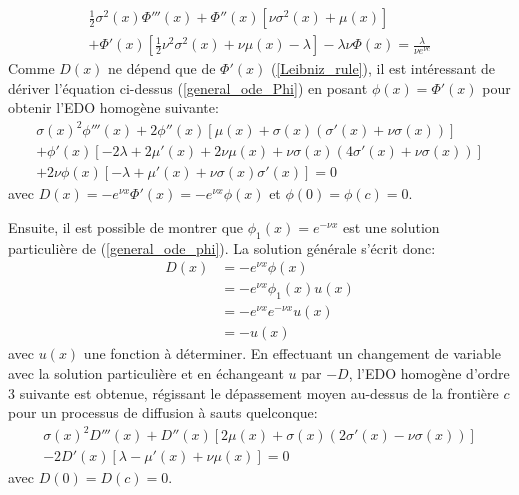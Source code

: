 \begin{equation}\label{general_ode_Phi}
    \begin{aligned}
        \frac{1}{2}\sigma^2(x)\Phi'''(x)+\Phi''(x)\left[\nu\sigma^2(x)+\mu(x)\right]\\+\Phi'(x)\left[\frac{1}{2}\nu^2\sigma^2(x)+\nu\mu(x)-\lambda\right]-\lambda\nu\Phi(x)=\frac{\lambda}{\nu e^{\nu c}}
    \end{aligned}
\end{equation}
Comme $D(x)$ ne dépend que de $\Phi'(x)$ (\ref{Leibniz_rule}), il est intéressant de dériver l'équation ci-dessus (\ref{general_ode_Phi}) en posant $\phi(x)=\Phi'(x)$ pour obtenir l'\acs{EDO} homogène suivante:
\begin{equation}\label{general_ode_phi}
    \begin{aligned}
        \sigma(x)^2 \phi'''(x)+2 \phi''(x) \left[\mu(x)+\sigma(x) \left(\sigma'(x)+\nu  \sigma(x)\right)\right]\\+\phi'(x) \left[-2 \lambda +2 \mu'(x)+2 \nu\mu(x)+\nu  \sigma(x) \left(4 \sigma'(x)+\nu  \sigma(x)\right)\right]\\+2 \nu  \phi(x) \left[-\lambda +\mu'(x)+\nu  \sigma(x) \sigma'(x)\right]=0
    \end{aligned}
\end{equation}
avec $D(x)=-e^{\nu x}\Phi'(x)=-e^{\nu x}\phi(x)$ et $\phi(0)=\phi(c)=0$.

Ensuite, il est possible de montrer que $\phi_1(x)=e^{-\nu x}$ est une solution particulière de (\ref{general_ode_phi}). La solution générale s'écrit donc: 
\[
\begin{aligned}
    D(x)&=-e^{\nu x}\phi(x)\\
    &=-e^{\nu x}\phi_1(x)u(x)\\
    &=-e^{\nu x}e^{-\nu x}u(x)\\
    &=-u(x)
\end{aligned}
\]
avec $u(x)$ une fonction à déterminer. En effectuant un changement de variable avec la solution particulière et en échangeant $u$ par $-D$, l'\acs{EDO} homogène d'ordre 3 suivante est obtenue, régissant le dépassement moyen au-dessus de la frontière $c$ pour un processus de diffusion à sauts quelconque: 
\begin{equation}\label{eq:general_ode_D}
    \begin{aligned}
        \sigma(x)^2 D'''(x)+D''(x) \left[2 \mu(x)+\sigma(x)(2\sigma'(x)-\nu  \sigma(x))\right]\\-2D'(x)[\lambda-\mu'(x)+\nu\mu(x)]=0
    \end{aligned}
\end{equation}
avec $D(0)=D(c)=0$.

